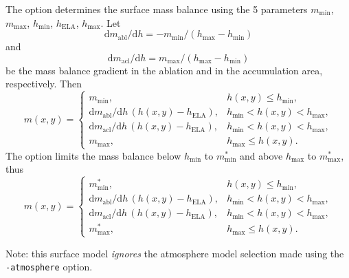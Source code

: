 \begin{itemize}
    The option  determines the surface mass balance using the 5 parameters $m_{\mathrm{min}}$, $m_{\mathrm{max}}$, $h_{\mathrm{min}}$, $h_{\mathrm{ELA}}$, $h_{\mathrm{max}}$. Let
    \begin{equation}
      \mathrm{d}m_{\mathrm{abl}}/\mathrm{d}h = - m_{\text{min}} / (h_{\text{max}} - h_{\text{min}})
    \end{equation}
    and
    \begin{equation}
      \mathrm{d}m_{\mathrm{acl}}/\mathrm{d}h = m_{\text{max}} / (h_{\text{max}} - h_{\text{min}})
    \end{equation}
    be the mass balance gradient in the ablation and in the accumulation area, respectively.  Then
    \begin{equation}
      m(x,y) = \begin{cases}
        m_{\text{min}}, & h(x,y) \le h_{\text{min}}, \\
        \mathrm{d}m_{\mathrm{abl}}/\mathrm{d}h\,(h(x,y) - h_{\text{ELA}}),
        &  h_{\text{min}} < h(x,y) < h_{\text{max}}, \\
        \mathrm{d}m_{\mathrm{acl}}/\mathrm{d}h\,(h(x,y) - h_{\text{ELA}}),
        &  h_{\text{min}} < h(x,y) < h_{\text{max}}, \\
        m_{\text{max}}, & h_{\text{max}} \le h(x,y). \end{cases}
    \end{equation}
    The option  limits the mass balance below $h_{\mathrm{min}}$ to $m^{*}_{\mathrm{min}}$ and above $h_{\mathrm{max}}$ to $m^{*}_{\mathrm{max}}$, thus
    \begin{equation}
      m(x,y) = \begin{cases}
        m^{*}_{\text{min}}, & h(x,y) \le h_{\text{min}}, \\
        \mathrm{d}m_{\mathrm{abl}}/\mathrm{d}h\,(h(x,y) - h_{\text{ELA}}),
        &  h_{\text{min}} < h(x,y) < h_{\text{max}}, \\
        \mathrm{d}m_{\mathrm{acl}}/\mathrm{d}h\,(h(x,y) - h_{\text{ELA}}),
        &  h_{\text{min}} < h(x,y) < h_{\text{max}}, \\
        m^{*}_{\text{max}}, & h_{\text{max}} \le h(x,y). \end{cases}
    \end{equation}

    Note: this surface model \emph{ignores} the atmosphere model selection made using the \texttt{-atmosphere} option.

\end{itemize}



